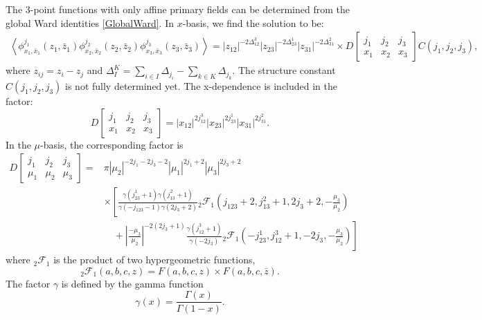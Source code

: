 \documentclass[10pt,a4paper]{article}
\numberwithin{equation}{section}
\newcommand{\vev}[1]{\left\langle #1 \right\rangle}
\begin{document}
The 3-point functions with only affine primary fields can be determined from the global Ward identities \eqref{GlobalWard}. 
In $x$-basis, we find the solution to be:
\begin{equation}
    \begin{aligned}
            \vev{\phi^{j_{1}}_{x_{1},\bar{x}_{1}}(z_{1},\bar{z}_{1}) \phi^{j_{2}}_{x_{2},\bar{x}_{2}}(z_{2},\bar{z}_{2}) \phi^{j_{3}}_{x_{3},\bar{x}_{3}}(z_{3},\bar{z}_{3})} =
            |z_{12}|^{-2 \Delta_{12}^{3}} |z_{23}|^{-2 \Delta_{23}^{1}} |z_{31}|^{-2 \Delta_{31}^{2}}
                 \times D \left[\begin{array}{ccc}
    j_{1} & j_{2} & j_{3} \\
    x_{1} & x_{2} & x_{3}
    \end{array} \right] C(j_{1},j_{2},j_{3}),
    \end{aligned} \label{3pointfuncx}
\end{equation}
where $z_{ij} = z_{i} - z_{j}$ and $\Delta^{K}_{I} = \sum_{i \in I} \Delta_{j_{i}} - \sum_{k \in K} \Delta_{j_{k}}$. The structure constant 
$C(j_{1},j_{2},j_{3})$ is not fully determined yet. The x-dependence is included in the factor:
\begin{equation}
    D \left[\begin{array}{ccc}
    j_{1} & j_{2} & j_{3} \\
    x_{1} & x_{2} & x_{3}
    \end{array} \right] = |x_{12}|^{2 j_{12}^{3}} |x_{23}|^{2 j_{23}^{1}} |x_{31}|^{2 j_{31}^{2}}.
\end{equation}
In the $\mu$-basis, the corresponding factor is 
\begin{equation}
    \begin{aligned}
        D \left[\begin{array}{ccc}
        j_{1} & j_{2} & j_{3} \\
        \mu_{1} & \mu_{2} & \mu_{3}
        \end{array} \right] = & \pi |\mu_{2}|^{-2 j_{1} - 2 j_{3} - 2} |\mu_{1}|^{2j_{1} + 2} |\mu_{3}|^{2j_{3} + 2} \\
                            & \times \left[\frac{\gamma(j_{23}^{1} + 1) \gamma(j_{13}^{2} + 1)}{\gamma(-j_{123}-1) \gamma(2j_{3}+2)} {}_{2} \mathcal{F}_{1} (j_{123} +2, j_{13}^{2} +1, 2j_{3} + 2, -\frac{\mu_{3}}{\mu_{2}}) \right.\\
                            &\quad + \left. \left| \frac{-\mu_{3}}{\mu_{2}}\right|^{-2(2j_{3}+1)} \frac{\gamma(j_{12}^{3} + 1)}{\gamma(-2 j_{3})} {}_{2} \mathcal{F}_{1} (-j_{23}^{1}, j_{12}^{3} +1, -2j_{3}, -\frac{\mu_{3}}{\mu_{2}}) \right]
    \end{aligned}
\end{equation}
where ${}_{2} \mathcal{F}_{1}$ is the product of two hypergeometric functions, 
\begin{equation}
    {}_{2}\mathcal{F}_{1}(a,b,c,z) = F(a,b,c,z) \times F(a,b,c,\bar{z}).
\end{equation}
The factor $\gamma$ is defined by the gamma function 
\begin{equation}
    \gamma(x) = \frac{\Gamma(x)}{\Gamma(1-x)}.
\end{equation}
\end{document}
